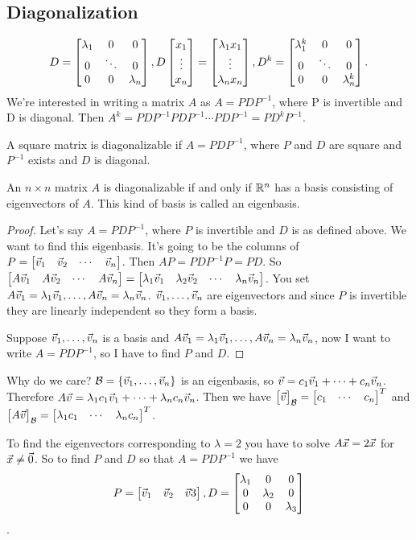 \documentclass[10pt,a4paper]{article}
\begin{document}
\subsection{Diagonalization}
$$D=\begin{bmatrix}\lambda_1 & 0 & 0 \\ 0 & \ddots & 0 \\ 0 & 0 & \lambda_n\end{bmatrix}, D\begin{bmatrix}x_1 \\ \vdots \\ x_n\end{bmatrix} = \begin{bmatrix}\lambda_1 x_1 \\ \vdots \\ \lambda_n x_n\end{bmatrix}, D^k = \begin{bmatrix}\lambda_1^k & 0 & 0 \\ 0 & \ddots & 0 \\ 0 & 0 & \lambda_n^k\end{bmatrix}.$$
We're interested in writing a matrix $A$ as $A= PDP^{-1}$, where P is invertible and D is diagonal. Then $A^k = PDP^{-1}PDP^{-1}\cdots PDP^{-1} = PD^kP^{-1}$.
\begin{definition}
	A square matrix is diagonalizable if $A = PDP^{-1}$, where $P$ and $D$ are square and $P^{-1}$ exists and $D$ is diagonal.
\end{definition}
\begin{theorem}
	An $n\times n$ matrix $A$ is diagonalizable if and only if $\mathbb{R}^n$ has a basis consisting of eigenvectors of $A$. This kind of basis is called an eigenbasis.
\end{theorem}
\begin{proof}
	Let's say $A=PDP^{-1}$, where $P$ is invertible and $D$ is as defined above. We want to find this eigenbasis. It's going to be the columns of $P = \begin{bmatrix}\vec{v}_1 & \vec{v}_2 & \cdots & \vec{v}_n\end{bmatrix}$. Then $AP = PDP^{-1}P = PD$. So $\begin{bmatrix}A\vec{v}_1 & A\vec{v}_2 & \cdots & A\vec{v}_n\end{bmatrix} = \begin{bmatrix}\lambda_1\vec{v}_1 & \lambda_2\vec{v}_2 &\cdots & \lambda_n\vec{v}_n\end{bmatrix}$. You set $A\vec{v}_1 = \lambda_1\vec{v}_1, \dots, A\vec{v}_n = \lambda_n\vec{v}_n$. $\vec{v}_1,\dots,\vec{v}_n$ are eigenvectors and since $P$ is invertible they are linearly independent so they form a basis.
	
	Suppose $\vec{v}_1,\dots,\vec{v}_n$ is a basis and $A\vec{v}_1=\lambda_1\vec{v}_1,\dots,A\vec{v}_n=\lambda_n\vec{v}_n$, now I want to write $A=PDP^{-1}$, so I have to find $P$ and $D$.
\end{proof}
Why do we care? $ \mathcal{B} = \{\vec{v}_1,\dots,\vec{v}_n\} $ is an eigenbasis, so $ \vec{v}=c_1\vec{v}_1 + \cdots + c_n\vec{v}_n $. Therefore $ A\vec{v} = \lambda_1 c_1 \vec{v}_1 + \cdots + \lambda_n c_n \vec{v}_n $. Then we have 
$ \begin{bmatrix}\vec{v}\end{bmatrix}_{\mathcal{B}} = \begin{bmatrix} c_1 & \cdots & c_n\end{bmatrix}^T $ 
and $ \begin{bmatrix}A\vec{v}\end{bmatrix}_{\mathcal{B}} = \begin{bmatrix} \lambda_1 c_1 & \cdots & \lambda_n c_n\end{bmatrix}^T $.
\begin{example}
	To find the eigenvectors corresponding to $\lambda=2$ you have to solve $A\vec{x} = 2\vec{x}$ for $\vec{x} \neq \vec{0}$. So to find $P$ and $D$ so that $A = PDP^{-1}$ we have $$P=\begin{bmatrix}\vec{v}_1&\vec{v}_2&\vec{v}3\end{bmatrix},D = \begin{bmatrix}\lambda_1&0&0\\0&\lambda_2&0\\0&0&\lambda_3\end{bmatrix}$$.
\end{example}
\end{document}
